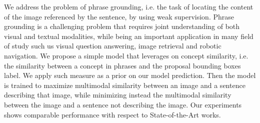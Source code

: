 
We address the problem of phrase grounding, i.e. the task of locating
the content of the image referenced by the sentence, by using weak
supervision. Phrase grounding is a challenging problem that requires
joint understanding of both visual and textual modalities, while being
an important application in many field of study such us visual
question answering, image retrieval and robotic navigation. We propose
a simple model that leverages on concept similarity, i.e. the
similarity between a concept in phrases and the proposal bounding
boxes label. We apply such measure as a prior on our model prediction.
Then the model is trained to maximize multimodal similarity between an
image and a sentence describing that image, while minimizing instead
the multimodal similarity between the image and a sentence not
describing the image. Our experiments shows comparable performance
with respect to State-of-the-Art works.